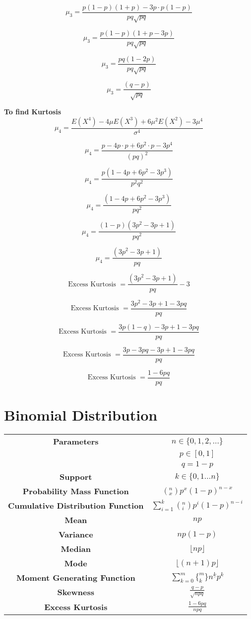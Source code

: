 \documentclass[14pt, a4paper]{article}
\theoremstyle{definition}
\begin{document}
\[\mu_3 = \frac{p(1 - p)(1+p) - 3p \cdot p (1 - p)}{pq \sqrt{pq}}\] 

\[\mu_3 = \frac{p (1 - p)(1+p - 3p)}{pq \sqrt{pq}}\] 

\[\mu_3 = \frac{p q(1 - 2p)}{pq \sqrt{pq}}\] 

\[\mu_3 = \frac{(q - p)}{\sqrt{pq}}\]


\textbf{To find Kurtosis}
\[ \mu_4 = \frac{ E(X^4) - 4 \mu E(X^3) + 6 \mu^2 E(X^2) - 3 \mu^4}{ \sigma^4} \]

\[\mu_4 = \frac{p - 4p \cdot p + 6p^2 \cdot p - 3 p^4}{(pq)^2}\]

\[\mu_4 = \frac{p(1-4p+6p^2 - 3p^3)}{p^2q^2}\]

\[\mu_4 = \frac{(1-4p+6p^2 - 3p^3)}{pq^2}\]

\[\mu_4 = \frac{(1-p)(3p^2 - 3p +1)}{pq^2}\]

\[\mu_4 = \frac{(3p^2 - 3p +1)}{pq}\]

\[\text{Excess Kurtosis } = \frac{(3p^2 - 3p +1)}{pq} - 3\]

\[\text{Excess Kurtosis } = \frac{3p^2 - 3p +1 - 3 pq}{pq}\]

\[\text{Excess Kurtosis } = \frac{3p(1- q) - 3p +1 - 3 pq}{pq}\]

\[\text{Excess Kurtosis } = \frac{3p- 3pq - 3p +1 - 3 pq}{pq}\]

\[\text{Excess Kurtosis } = \frac{1 - 6 pq}{pq}\]


\section{Binomial Distribution}

\begin{center}
    \begin{tabular}{|c|c|}  %
\hline
 \textbf{Parameters }& $n \in \{0,1,2, \dots \}$ \\ & $p \in [0,1]$ \\ & $q = 1-p$  \\
 \hline
 \textbf{Support} & $k \in \{ 0,1 \dots n \} $ \\
 \hline
 \textbf{Probability Mass Function} & 
 $ (^n_x)p^x(1-p)^{n-x}$
 \\
 \hline
 \textbf{Cumulative Distribution Function} &
 $\sum^k_{i=1}(^n_i)p^i(1-p)^{n-i}$ \\
 \hline
 \textbf{Mean} & $np$ \\ 
 \hline
 \textbf{Variance} & $np(1-p)$ \\
 \hline
 \textbf{Median} & $\lfloor np \rfloor $ \\ 
 \hline
 \textbf{Mode} & $\lfloor (n+1)p \rfloor $ \\
 \hline
 \textbf{Moment Generating Function} & $\sum^m_{k=0} \{ ^m_k\} n^{\underline{k}} p^k$ \\
 \hline
 \textbf{Skewness} & $\frac{q-p}{\sqrt{npq}}$ \\
 \hline
 \textbf{Excess Kurtosis} & $\frac{1-6pq}{npq}$  \\
 \hline
       
  \end{tabular}
\end{center}
\end{document}
